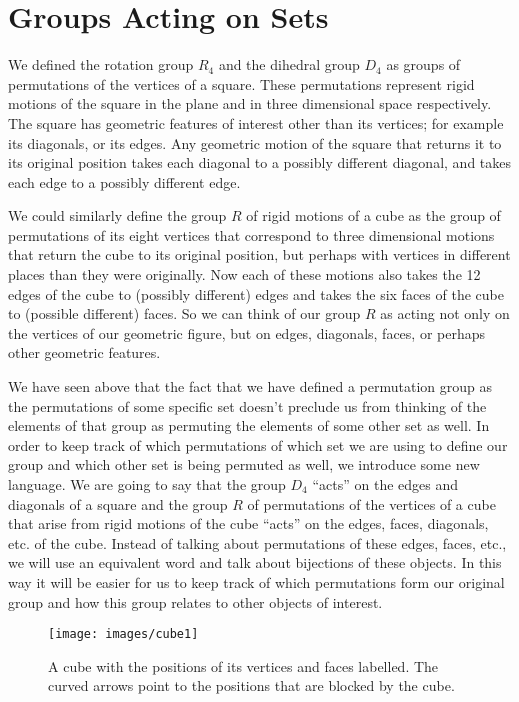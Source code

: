 \documentclass[10pt,]{book}
\theoremstyle{plain}
\theoremstyle{definition}
\numberwithin{equation}{chapter}
\begin{document}
\section[{Groups Acting on Sets}]{Groups Acting on Sets}\label{sec_groups-groupsact}
\typeout{************************************************}
\typeout{************************************************}
We defined the rotation group \(R_4\) and the dihedral group \(D_4\) as groups of permutations of the vertices of a square. These permutations represent rigid motions of the square in the plane and in three dimensional space respectively. The square has geometric features of interest other than its vertices; for example its diagonals, or its edges. Any geometric motion of the square that returns it to its original position takes each diagonal to a possibly different diagonal, and takes each edge to a possibly different edge.%
\par
We could similarly define the group \(R\) of rigid motions of a cube as the group of permutations of its eight vertices that correspond to three dimensional motions that return the cube to its original position, but perhaps with vertices in different places than they were originally. Now each of these motions also takes the 12 edges of the cube to (possibly different) edges and takes the six faces of the cube to (possible different) faces. So we can think of our group \(R\) as acting not only on the vertices of our geometric figure, but on edges, diagonals, faces, or perhaps other geometric features.%
\par
We have seen above that the fact that we have defined a permutation group as the permutations of some specific set doesn't preclude us from thinking of the elements of that group as permuting the elements of some other set as well. In order to keep track of which permutations of which set we are using to define our group and which other set is being permuted as well, we introduce some new language. We are going to say that the group \(D_4\) ``acts'' on the edges and diagonals of a square and the group \(R\) of permutations of the vertices of a cube that arise from rigid motions of the cube ``acts'' on the edges, faces, diagonals, etc. of the cube. Instead of talking about permutations of these edges, faces, etc., we will use an equivalent word and talk about bijections of these objects. In this way it will be easier for us to keep track of which permutations form our original group and how this group relates to other objects of interest.%
\begin{figure}
\centering
\texttt{[image: images/cube1]}
\caption{A cube with the positions of its vertices and faces labelled.  The curved arrows point to the positions that are blocked by the cube.\label{cube1}}
\end{figure}
\end{document}
